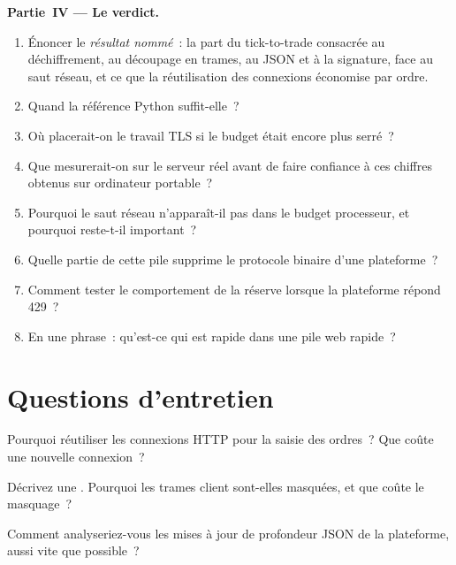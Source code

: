 \begin{problem}
\medskip\noindent\textbf{Partie~IV --- Le verdict.}
\begin{enumerate}[resume]
\item Énoncer le \emph{résultat nommé}~: la part du tick-to-trade consacrée au déchiffrement, au découpage en trames, au JSON et à la signature, face au
saut réseau, et ce que la réutilisation des connexions économise par ordre.
\item Quand la référence Python suffit-elle~?
\item Où placerait-on le travail TLS si le budget était encore plus serré~?
\item Que mesurerait-on sur le serveur réel avant de faire confiance à ces chiffres obtenus sur ordinateur portable~?
\item Pourquoi le saut réseau n'apparaît-il pas dans le budget processeur, et pourquoi reste-t-il important~?
\item Quelle partie de cette pile supprime le protocole binaire d'une plateforme~?
\item Comment tester le comportement de la réserve lorsque la plateforme répond 429~?
\item En une phrase~: qu'est-ce qui est rapide dans une pile web rapide~?
\end{enumerate}
\end{problem}

\section{Questions d'entretien}

\begin{interviewq}\label{iq:ll:websocket-rest-tls-and-json-at-speed:1}
Pourquoi réutiliser les connexions HTTP pour la saisie des ordres~? Que coûte une nouvelle connexion~?
\end{interviewq}

\begin{interviewq}\label{iq:ll:websocket-rest-tls-and-json-at-speed:2}
Décrivez une . Pourquoi les trames client sont-elles masquées, et que coûte le masquage~?
\end{interviewq}

\begin{interviewq}\label{iq:ll:websocket-rest-tls-and-json-at-speed:3}
Comment analyseriez-vous les mises à jour de profondeur JSON de la plateforme, aussi vite que possible~?
\end{interviewq}

